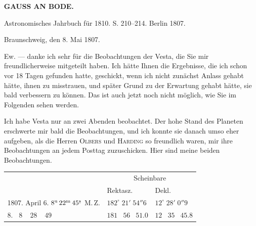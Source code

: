 \clearpage
{}
%
\begin{center}
\textbf{GAUSS AN BODE.}

\hrulefill

Astronomisches Jahrbuch für 1810. S. 210–214. Berlin 1807.

\hrulefill
\end{center}

\begin{flushright}
Braunschweig, den 8. Mai 1807.
\end{flushright}

\par\indent Ew. --- danke ich sehr für die Beobachtungen der Vesta, die Sie mir freundlicherweise mitgeteilt haben. Ich hätte Ihnen die Ergebnisse, die ich schon vor 18 Tagen gefunden hatte, geschickt, wenn ich nicht zunächst Anlass gehabt hätte, ihnen zu misstrauen, und später Grund zu der Erwartung gehabt hätte, sie bald verbessern zu können. Das ist auch jetzt noch nicht möglich, wie Sie im Folgenden sehen werden.

\par\indent Ich habe Vesta nur an zwei Abenden beobachtet. Der hohe Stand des Planeten erschwerte mir bald die Beobachtungen, und ich konnte sie danach umso eher aufgeben, als die Herren \textsc{Olbers} und \textsc{Harding} so freundlich waren, mir ihre Beobachtungen an jedem Posttag zuzuschicken. Hier sind meine beiden Beobachtungen.

\begin{center}\begingroup
\fontsize{9}{11}\selectfont
\setlength{\tabcolsep}{3pt}\renewcommand{\arraystretch}{1.15}
\begin{tabular}{l|l|l}
& \multicolumn{2}{c}{Scheinbare} \\
& Rektasz. \VestaAltarRA{} & Dekl. \VestaAltarDecl{} \\
\hline
1807. April 6. $8^{\mathrm u}\,22^{\mathrm m}\,45^{\rlap{\raisebox{-.32ex}{\hspace{.10em}\rule{.12em}{.28pt}}}\mathrm s}$ M.\,Z. & $182^\circ\;21'\;54''6$ & $12^\circ\;28'\;0''9$ \\
\phantom{1807. April} 8. $\;\;8\;\;\;\;28\;\;\;\;49$ & $181\;\;\;56\;\;\;51.0$ & $12\;\;\;35\;\;\;45.8$ \\
\end{tabular}\endgroup\end{center}

